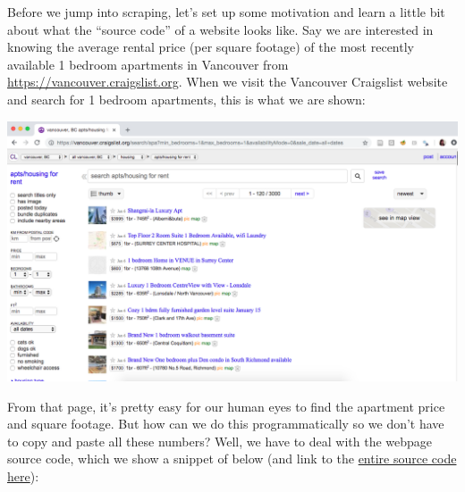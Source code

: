 \documentclass[
]{article}
\begin{document}
Before we jump into scraping, let's set up some motivation and learn a
little bit about what the ``source code'' of a website looks like. Say
we are interested in knowing the average rental price (per square
footage) of the most recently available 1 bedroom apartments in
Vancouver from \url{https://vancouver.craigslist.org}. When we visit the
Vancouver Craigslist website and search for 1 bedroom apartments, this
is what we are shown:

\includegraphics{img/craigslist_human.png}

From that page, it's pretty easy for our human eyes to find the
apartment price and square footage. But how can we do this
programmatically so we don't have to copy and paste all these numbers?
Well, we have to deal with the webpage source code, which we show a
snippet of below (and link to the \href{img/website_source.txt}{entire
source code here}):
\end{document}
